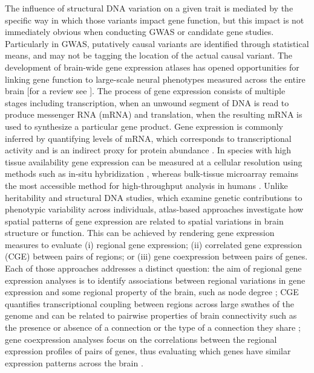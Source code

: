 The influence of structural DNA variation on a given trait is mediated by the specific way in which those variants impact gene function, but this impact is not immediately obvious when conducting GWAS or candidate gene studies. Particularly in GWAS, putatively causal variants are identified through statistical means, and may not be tagging the location of the actual causal variant. The development of brain-wide gene expression atlases \citep{Harris2010,Hawrylycz2012,Lein2007a} has opened opportunities for linking gene function to large-scale neural phenotypes measured across the entire brain [for a review see \citet{Fornito2019}]. The process of gene expression consists of multiple stages including transcription, when an unwound segment of DNA is read to produce messenger RNA (mRNA) and translation, when the resulting mRNA is used to synthesize a particular gene product. Gene expression is commonly inferred by quantifying levels of mRNA, which corresponds to transcriptional activity and is an indirect proxy for protein abundance \citep{Liu2016}. In species with high tissue availability gene expression can be measured at a cellular resolution using methods such as in-situ hybridization \citep{Lein2007a,Unger2010}, whereas bulk-tissue microarray \citep{Schulze2001} remains the most accessible method for high-throughput analysis in humans \citep{Hawrylycz2012}. Unlike heritability and structural DNA studies, which examine genetic contributions to phenotypic variability across individuals, atlas-based approaches investigate how spatial patterns of gene expression are related to spatial variations in brain structure or function. This can be achieved by rendering gene expression measures to evaluate (i) regional gene expression; (ii) correlated gene expression (CGE) between pairs of regions; or (iii) gene coexpression between pairs of genes. Each of those approaches addresses a distinct question: the aim of regional gene expression analyses is to identify associations between regional variations in gene expression and some regional property of the brain, such as node degree \citep{French2011}; CGE quantifies transcriptional coupling between regions across large swathes of the genome and can be related to pairwise properties of brain connectivity such as the presence or absence of a connection or the type of a connection they share \citep{Arnatkeviciute2018,Fulcher2016,Richiardi2015}; gene coexpression analyses focus on the correlations between the regional expression profiles of pairs of genes, thus evaluating which genes have similar expression patterns across the brain \citep{Forest2017}.

